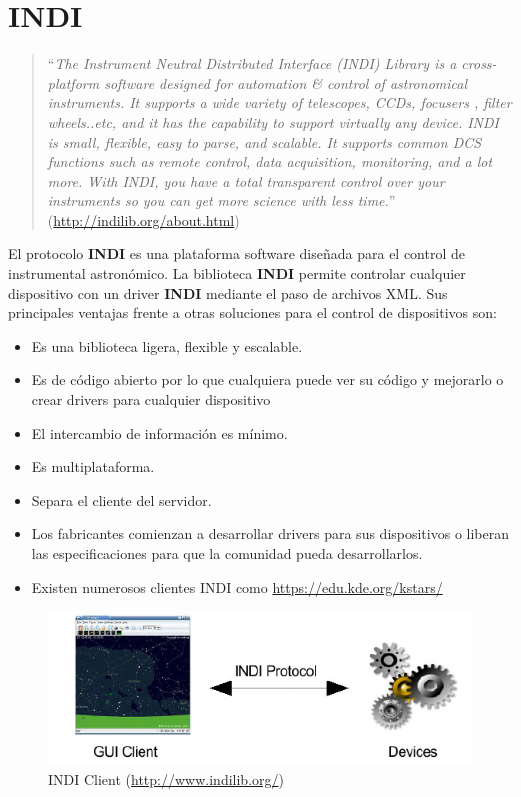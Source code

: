 \newpage
\section{INDI}

\begin{quote}``\textit{The Instrument Neutral Distributed Interface (INDI) Library is a cross-platform software designed for automation & control of astronomical instruments. It supports a wide variety of telescopes, CCDs, focusers , filter wheels..etc, and it has the capability to support virtually any device. INDI is small, flexible, easy to parse, and scalable. It supports common DCS functions such as remote control, data acquisition, monitoring, and a lot more. With INDI, you have a total transparent control over your instruments so you can get more science with less time.}''
\newline(\url{http://indilib.org/about.html})
\end{quote}

\bigskip

El protocolo \textbf{INDI} es una plataforma software diseñada para el control de instrumental astronómico. La biblioteca \textbf{INDI} permite controlar cualquier dispositivo con un driver \textbf{INDI} mediante el paso de archivos XML. Sus principales ventajas frente a otras soluciones para el control de dispositivos son:


\begin{itemize}
  \item Es una biblioteca ligera, flexible y escalable.
  \item Es de código abierto por lo que cualquiera puede ver su código y mejorarlo o crear drivers para cualquier dispositivo
  \item El intercambio de información es mínimo.
  \item Es multiplataforma.
  \item Separa el cliente del servidor.
  \item Los fabricantes comienzan a desarrollar drivers para sus dispositivos o liberan las especificaciones para que la comunidad pueda desarrollarlos.
  \item Existen numerosos clientes INDI como \url{https://edu.kde.org/kstars/}

\end{itemize}

\bigskip
\begin{figure}[!ht]
  \begin{center}
    \includegraphics[width=1\textwidth]{../images/Indi_client.png}
    \caption{INDI Client (\url{http://www.indilib.org/})}
    \label{fig:indi_client}
  \end{center}
\end{figure}

